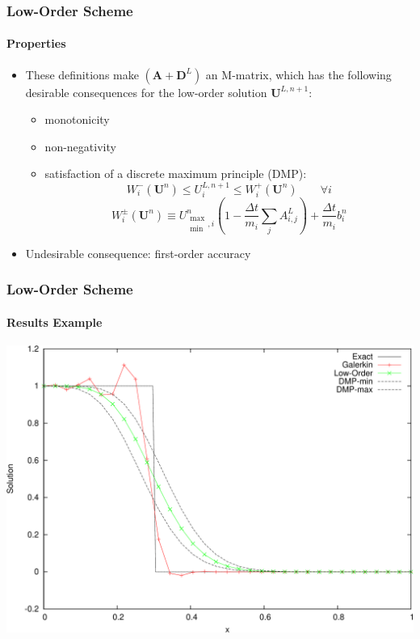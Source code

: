 \documentclass{beamer}
\renewcommand{\ij}{_{i,j}}
\newcommand{\U}{\mathbf{U}}
\newcommand{\A}{\mathbf{A}}
\newcommand{\D}{\mathbf{D}}
\newcommand{\dt}{\Delta t}
\begin{document}
\begin{frame}
\frametitle{Low-Order Scheme}
\framesubtitle{Properties}

\begin{itemize}
   \item These definitions make $(\A + \D^L)$ an M-matrix, which has
      the following desirable consequences for the low-order solution $\U^{L,n+1}$:
   \begin{itemize}
      \item monotonicity
      \item non-negativity
      \item satisfaction of a discrete maximum principle (DMP):
      \begin{equation}\label{eq:dmp}
         W_i^-(\U^n)\leq
         U_i^{L,n+1}\leq
         W_i^+(\U^n)\qquad\forall i
      \end{equation}
      \begin{equation}
         W_i^\pm(\U^n) \equiv U_{\substack{\max\\\min},i}^n\left(1-\frac{\dt}{m_i}
         \sum\limits_j A\ij^L\right)
         + \frac{\Delta t}{m_i}b_i^n
      \end{equation}
   \end{itemize}
   \item Undesirable consequence: first-order accuracy
\end{itemize}

\end{frame}
\begin{frame}
\frametitle{Low-Order Scheme}
\framesubtitle{Results Example}

\includegraphics[width=\textwidth]{./figures/advection_low_order.pdf}

\end{frame}
\end{document}
